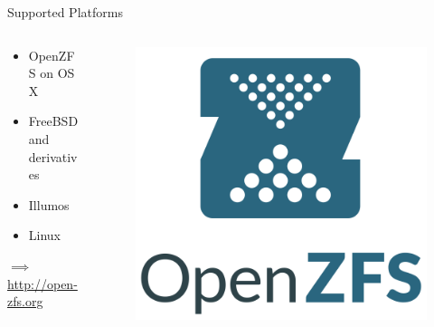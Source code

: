 \begin{frame}{Supported Platforms}
		\begin{columns}
			\begin{column}{0.5\linewidth}
				\begin{itemize}
					\item OpenZFS on OS X
					\item FreeBSD and derivatives
					\item Illumos
					\item Linux
				\end{itemize}
				\vspace{2em}
				$\implies$ \url{http://open-zfs.org}
			\end{column}
			\begin{column}{0.5\linewidth}
				\begin{figure}
					\centering
					\includegraphics[height=0.4\textheight]{assets/contrib/openzfs/openzfs_logo}
				\end{figure}
			\end{column}
		\end{columns}
\end{frame}